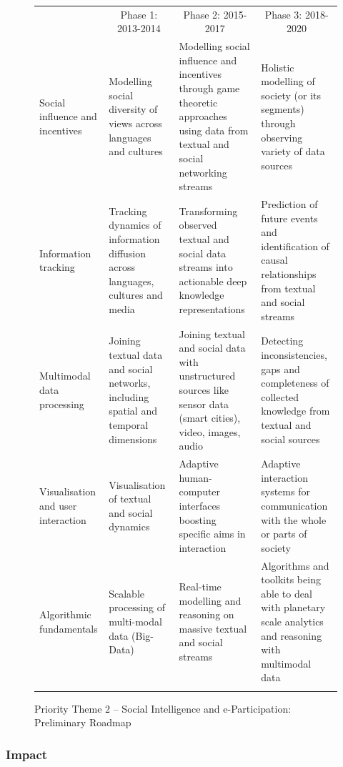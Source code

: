 \documentclass[10pt, plain]{../../metanetpaper}
\begin{document}
\begin{multicols}{2}
\begin{figure}[htb]
  \centering
  \small
  \begin{tabular}{@{}p{2.5cm}p{4cm}p{4cm}p{4cm}@{}} \toprule\addlinespace
    \multicolumn{1}{c}{Research Priority} & \multicolumn{1}{c}{Phase 1: 2013-2014} & \multicolumn{1}{c}{Phase 2: 2015-2017} & \multicolumn{1}{c}{Phase 3: 2018-2020} \\ \addlinespace\midrule\addlinespace
    Social influence and incentives & Modelling social diversity of views across languages and cultures & Modelling social influence and incentives  through game theoretic approaches using data from textual and social networking streams & Holistic modelling of society (or its segments) through observing variety of data sources \\ \addlinespace
    Information tracking & Tracking dynamics of information diffusion across languages, cultures and media & Transforming observed textual and social data streams into actionable deep knowledge representations & Prediction of future events and identification of causal relationships from textual and social streams \\ \addlinespace
    Multimodal data processing & Joining textual data and social networks, including spatial and temporal dimensions & Joining textual and social data with unstructured sources like sensor data (smart cities), video, images, audio & Detecting inconsistencies, gaps and completeness of collected knowledge from textual and social sources \\ \addlinespace
    Visualisation and user interaction & Visualisation of textual and social dynamics & Adaptive human-computer interfaces boosting specific aims in interaction & Adaptive interaction systems for communication with the whole or parts of society \\ \addlinespace
    Algorithmic fundamentals & Scalable processing of multi-modal data (Big-Data) & Real-time modelling and reasoning on massive textual and social streams & Algorithms and toolkits being able to deal with planetary scale analytics and reasoning with multimodal data \\ \addlinespace\bottomrule
  \end{tabular}
  \caption{Priority Theme 2 -- Social Intelligence and e-Participation: Preliminary Roadmap}
  \label{fig:pt2-roadmap}
\end{figure}

\subsubsection{Impact}
\label{sec:impact-pt2}


\end{multicols}
\end{document}
